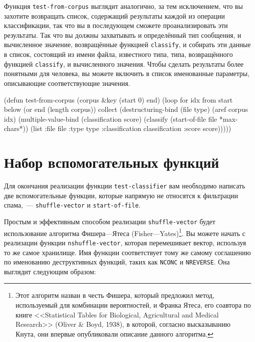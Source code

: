Функция \lstinline{test-from-corpus} выглядит аналогично, за тем исключением, что вы захотите
возвращать список, содержащий результаты каждой из операции классификации, так что вы в
последующем сможете проанализировать эти результаты.  Так что вы должны захватывать и
определённый тип сообщения, и вычисленное значение, возвращённые функцией \lstinline{classify},
и собирать эти данные в список, состоящий из имени файла, известного типа, типа,
возвращённого функцией \lstinline{classify}, и вычисленного значения.  Чтобы сделать результаты
более понятными для человека, вы можете включить в список именованные параметры,
описывающие соответствующие значения.

\begin{myverb}
(defun test-from-corpus (corpus &key (start 0) end)
  (loop for idx from start below (or end (length corpus)) collect
        (destructuring-bind (file type) (aref corpus idx)
          (multiple-value-bind (classification score)
              (classify (start-of-file file *max-chars*))
            (list 
             :file file
             :type type
             :classification classification
             :score score)))))
\end{myverb}


\section{Набор вспомогательных функций}

Для окончания реализации функции \lstinline{test-classifier} вам необходимо написать две
вспомогательные функции, которые напрямую не относятся к фильтрации спама,~---
\lstinline{shuffle-vector} и \lstinline{start-of-file}.

Простым и эффективным способом реализации \lstinline{shuffle-vector} будет использование
алгоритма Фишера---Ятеса (Fisher---Yates)\footnote{Этот алгоритм назван в честь Фишера,
  который предложил метод, используемый для комбинации вероятностей, и Франка Ятеса, его
  соавтора по книге <<Statistical Tables for Biological, Agricultural and Medical
  Research>> (Oliver \& Boyd, 1938), в которой, согласно высказыванию Кнута, они впервые
  опубликовали описание данного алгоритма.}.  Вы можете начать с реализации функции
  \lstinline{nshuffle-vector}, которая перемешивает вектор, используя то же самое хранилище.
  Имя функции соответствует тому же самому соглашению по именованию деструктивных функций,
  таких как \lstinline{NCONC} и \lstinline{NREVERSE}.  Она выглядит следующим образом:

